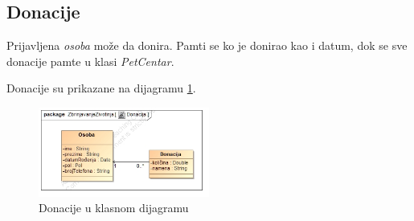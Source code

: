 \subsection{Donacije}
\par Prijavljena \textit{osoba} može da donira. Pamti se ko je donirao kao i datum, dok se sve donacije pamte u klasi \textit{PetCentar}.
\par Donacije su prikazane na dijagramu \ref{fig:donations}.
\begin{figure}[h]
    \centering
    \includegraphics[width=0.5\textwidth, height=0.4\textwidth]{img/donation.jpg}
    \caption{Donacije u klasnom dijagramu}
    \label{fig:donations}
\end{figure}
